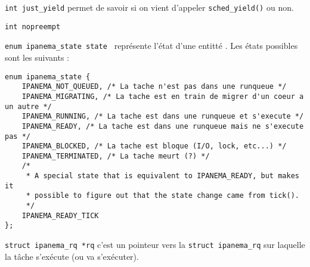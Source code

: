 \par \texttt{int just\_yield} permet de savoir si on vient d'appeler \texttt{sched\_yield()} ou non.\\
\par \texttt{int nopreempt}

\par \texttt{enum ipanema\_state state } représente l'état d'une entitté \ipa. Les états possibles sont les suivants :
\begin{lstlisting}[style=CStyle]
enum ipanema_state {
	IPANEMA_NOT_QUEUED, /* La tache n'est pas dans une runqueue */
	IPANEMA_MIGRATING, /* La tache est en train de migrer d'un coeur a un autre */
	IPANEMA_RUNNING, /* La tache est dans une runqueue et s'execute */
	IPANEMA_READY, /* La tache est dans une runqueue mais ne s'execute pas */
	IPANEMA_BLOCKED, /* La tache est bloque (I/O, lock, etc...) */
	IPANEMA_TERMINATED, /* La tache meurt (?) */
	/*
	 * A special state that is equivalent to IPANEMA_READY, but makes it
	 * possible to figure out that the state change came from tick().
	 */
	IPANEMA_READY_TICK
};
\end{lstlisting}

\par \texttt{struct ipanema\_rq *rq} c'est un pointeur vers la \texttt{struct ipanema\_rq} sur laquelle la tâche s'exécute (ou va s'exécuter).